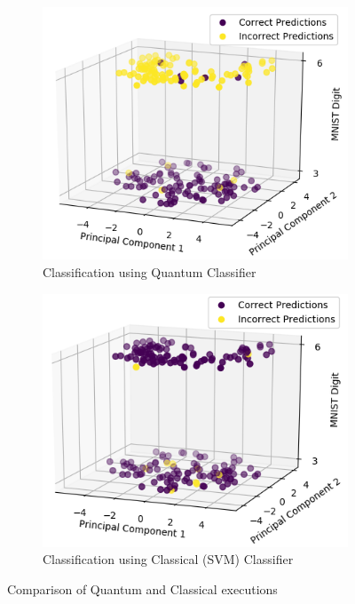 \documentclass[english,a4paper,11pt,oneside,onecolumn]{book}
\begin{document}
\begin{figure}[H]
    \begin{subfigure}{0.5\textwidth}
    \begin{center}
    \includegraphics[width=1.0\linewidth]{Images/QuantumPredictions.PNG}
    \end{center}
    \caption{Classification using Quantum Classifier}
    \end{subfigure}
    \begin{subfigure}{0.5\textwidth}
    \begin{center}
    \includegraphics[width=1.0\linewidth]{Images/ClassicalPredictions.PNG}
    \end{center}
    \caption{Classification using Classical (SVM) Classifier}
    \end{subfigure}
    \caption{Comparison of Quantum and Classical executions}
    \label{fig:compareResult}
\end{figure}
\end{document}
